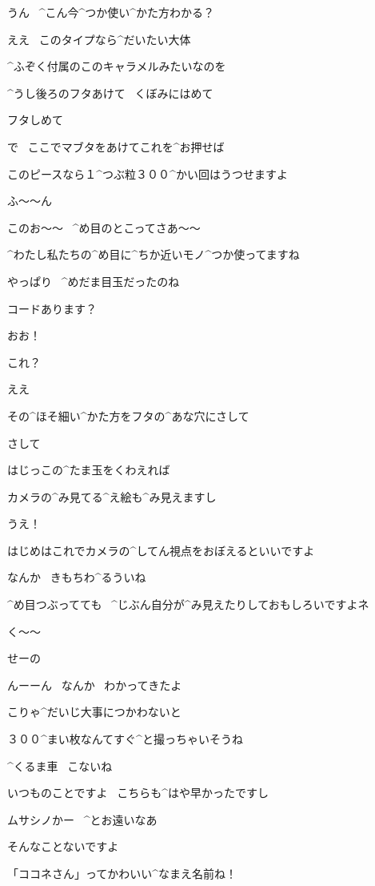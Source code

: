\A うん
\ ^{こん}{今}^{つか}{使}い^{かた}{方}わかる？

\K ええ
\ このタイプなら^{だいたい}{大体}

\page
\K ^{ふぞく}{付属}のこのキャラメルみたいなのを

\K ^{うし}{後}ろのフタあけて
\ くぼみにはめて

\K フタしめて

\K で
\ ここでマブタをあけてこれを^{お}{押}せば

\K このピースなら１^{つぶ}{粒}３００^{かい}{回}はうつせますよ

\A ふ〜〜ん

\page
\A このお〜〜
\ ^{め}{目}のとこってさあ〜〜

\K ^{わたし}{私}たちの^{め}{目}に^{ちか}{近}いモノ^{つか}{使}ってますね

\A やっぱり
\ ^{めだま}{目玉}だったのね

\page
\K コードあります？

\A おお！

\A これ？

\K ええ

\K その^{ほそ}{細}い^{かた}{方}をフタの^{あな}{穴}にさして

\A さして

\K はじっこの^{たま}{玉}をくわえれば

\page
\K カメラの^{み}{見}てる^{え}{絵}も^{み}{見}えますし

\A うえ！

\K はじめはこれでカメラの^{してん}{視点}をおぼえるといいですよ

\A なんか
\ きもちわ^{る}{う}いね

\K ^{め}{目}つぶってても
\ ^{じぶん}{自分}が^{み}{見}えたりしておもしろいですよネ

\A く〜〜

\page
\A せーの

\A んーーん
\ なんか
\ わかってきたよ

\A こりゃ^{だいじ}{大事}につかわないと

\A ３００^{まい}{枚}なんてすぐ^{と}{撮}っちゃいそうね

\page
\A ^{くるま}{車}
\ こないね

\K いつものことですよ
\ こちらも^{はや}{早}かったですし

\page
\A ムサシノかー
\ ^{とお}{遠}いなあ

\K そんなことないですよ

\A 「ココネさん」ってかわいい^{なまえ}{名前}ね！

